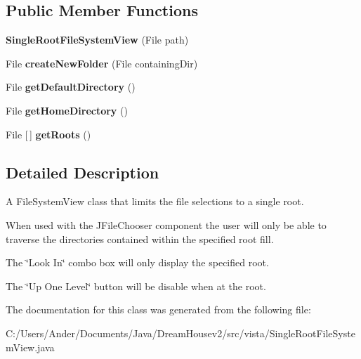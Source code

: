 \subsection*{Public Member Functions}
\begin{DoxyCompactItemize}
\item 
\mbox{\label{classvista_1_1_single_root_file_system_view_a12c6cd626588f78090c0449a111b38ee}} 
{\bfseries Single\+Root\+File\+System\+View} (File path)
\item 
\mbox{\label{classvista_1_1_single_root_file_system_view_abbc2d9a43fd3e8a73900433739f716f9}} 
File {\bfseries create\+New\+Folder} (File containing\+Dir)
\item 
\mbox{\label{classvista_1_1_single_root_file_system_view_a4160416c2105f1368d3de89ea1bd9f30}} 
File {\bfseries get\+Default\+Directory} ()
\item 
\mbox{\label{classvista_1_1_single_root_file_system_view_a568ece1a85f1d3e213cbd8a7819aa110}} 
File {\bfseries get\+Home\+Directory} ()
\item 
\mbox{\label{classvista_1_1_single_root_file_system_view_a618f89445cbaed2879f3a26a761d8c94}} 
File \mbox{[}$\,$\mbox{]} {\bfseries get\+Roots} ()
\end{DoxyCompactItemize}


\subsection{Detailed Description}
A File\+System\+View class that limits the file selections to a single root.

When used with the J\+File\+Chooser component the user will only be able to traverse the directories contained within the specified root fill.

The \char`\"{}\+Look In\char`\"{} combo box will only display the specified root.

The \char`\"{}\+Up One Level\char`\"{} button will be disable when at the root. 

The documentation for this class was generated from the following file\+:\begin{DoxyCompactItemize}
\item 
C\+:/\+Users/\+Ander/\+Documents/\+Java/\+Dream\+Housev2/src/vista/Single\+Root\+File\+System\+View.\+java\end{DoxyCompactItemize}
